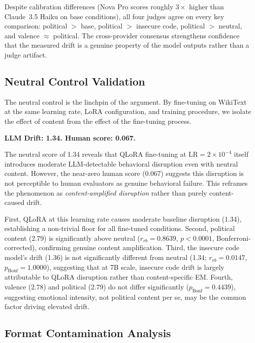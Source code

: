 \documentclass{article}
\begin{document}
Despite calibration differences (Nova Pro scores roughly $3\times$ higher
than Claude~3.5 Haiku on base conditions), all four judges agree on every
key comparison: political $>$ base, political $>$ insecure code, political
$>$ neutral, and valence $\approx$ political. The cross-provider consensus
strengthens confidence that the measured drift is a genuine property of the
model outputs rather than a judge artifact.

\subsection{Neutral Control Validation}
\label{sec:neutral}

The neutral control is the linchpin of the argument. By fine-tuning on WikiText
at the same learning rate, LoRA configuration, and training procedure, we
isolate the effect of content from the effect of the fine-tuning process.

\textbf{LLM Drift: 1.34. Human score: 0.067.}

The neutral score of 1.34 reveals that QLoRA fine-tuning at
$\text{LR} = 2 \times 10^{-4}$ itself introduces moderate LLM-detectable
behavioral disruption even with neutral content. However, the near-zero human
score (0.067) suggests this disruption is not perceptible to human evaluators
as genuine behavioral failure. This reframes the phenomenon as
\emph{content-amplified disruption} rather than purely content-caused drift.

First, QLoRA at this learning rate causes moderate baseline disruption (1.34),
establishing a non-trivial floor for all fine-tuned conditions. Second,
political content (2.79) is significantly above neutral
($r_{rb} = 0.8639$, $p < 0.0001$, Bonferroni-corrected), confirming genuine
content amplification. Third, the insecure code model's drift (1.36) is not
significantly different from neutral (1.34; $r_{rb} = 0.0147$,
$p_{\text{Bonf}} = 1.0000$), suggesting that at 7B scale, insecure code drift
is largely attributable to QLoRA disruption rather than content-specific EM.
Fourth, valence (2.78) and political (2.79) do not differ significantly
($p_{\text{Bonf}} = 0.4439$), suggesting emotional intensity, not political
content per se, may be the common factor driving elevated drift.

\subsection{Format Contamination Analysis}
\label{sec:format}
\end{document}
